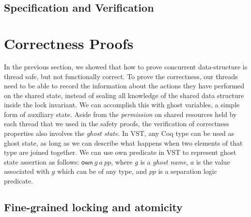 \documentclass[acmsmall,screen]{acmart}\settopmatter{printfolios=true}
\begin{document}
\subsection{Specification and Verification}
\section{Correctness Proofs}
In the previous section, we showed that how to prove concurrent data-structure is thread safe, but not functionally correct. To prove the correctness, our threads need to be able to record the information about the actions they have performed on the shared state, instead of sealing all knowledge of the shared data structure inside the lock invariant. We can accomplish this with ghost variables, a simple form of auxiliary state. Aside from the \emph{permission} on shared resources held by each thread that we used in the safety proofs, the verification of correctness properties also involves the \emph{ghost state}. In VST, any Coq type can be used as ghost state, as long as we can describe what happens when two elements of that type are joined together. We can use own predicate in VST to represent ghost state assertion as follows: $\mathsf{own}\ g\ a\ \mathit{pp}$, where $g$ is a \emph{ghost name}, $a$ is the value associated with $g$ which can be of any type, and $\mathit{pp}$ is a separation logic predicate. 



\subsection{Fine-grained locking and atomicity}
\label{atomicity}
\end{document}
